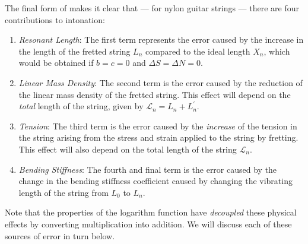 The final form of  makes it clear that --- for nylon guitar strings --- there are four contributions to intonation:
 \begin{enumerate}
  \item
   \emph{Resonant Length}: The first term represents the error caused by the increase in the length of the fretted string $L_n$ compared to the ideal length $X_n$, which would be obtained if $b = c = 0$ and $\Delta S = \Delta N = 0$.
  \item
   \emph{Linear Mass Density}: The second term is the error caused by the reduction of the linear mass density of the fretted string. This effect will depend on the \emph{total} length of the string, given by $\mathcal{L}_n = L_n + L^\prime_n$.
  \item
   \emph{Tension}: The third term is the error caused by the \emph{increase} of the tension in the string arising from the stress and strain applied to the string by fretting. This effect will also depend on the total length of the string $\mathcal{L}_n$.
  \item
   \emph{Bending Stiffness}: The fourth and final term is the error caused by the change in the bending stiffness coefficient caused by changing the vibrating length of the string from $L_0$ to $L_n$.
 \end{enumerate}
Note that the properties of the logarithm function have \emph{decoupled} these physical effects by converting multiplication into addition. We will discuss each of these sources of error in turn below.

